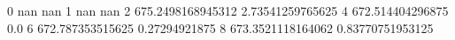 0 nan nan
1 nan nan
2 675.2498168945312 2.73541259765625
4 672.514404296875 0.0
6 672.787353515625 0.27294921875
8 673.3521118164062 0.83770751953125
